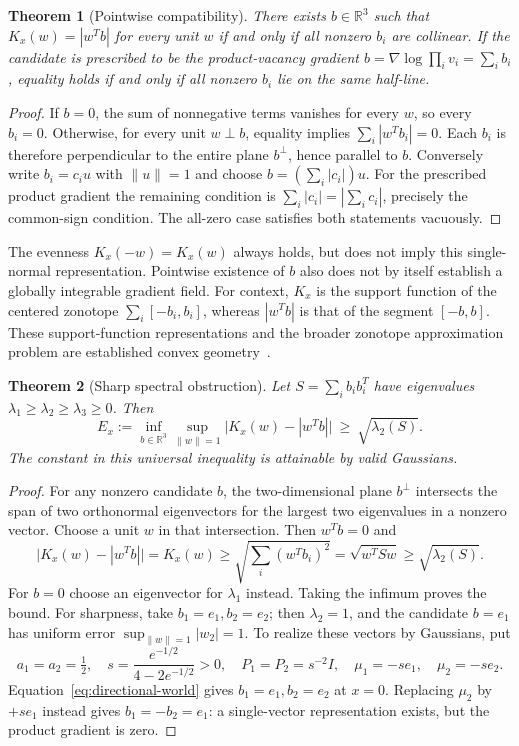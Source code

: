 \documentclass[11pt,a4paper]{article}
\newtheorem{theorem}{Theorem}
\newcommand{\R}{\mathbb{R}}
\begin{document}
\begin{theorem}[Pointwise compatibility]\label{thm:directional-rank}
There exists $b\in\R^3$ such that $K_x(w)=|w^Tb|$ for every unit $w$
if and only if all nonzero $b_i$ are collinear. If the candidate is
prescribed to be the product-vacancy gradient
$b=\nabla\log\prod_i v_i=\sum_i b_i$, equality holds if and only if
all nonzero $b_i$ lie on the same half-line.
\end{theorem}
\begin{proof}
If $b=0$, the sum of nonnegative terms vanishes for every $w$, so
every $b_i=0$. Otherwise, for every unit $w\perp b$, equality implies
$\sum_i|w^Tb_i|=0$. Each $b_i$ is therefore perpendicular to the
entire plane $b^\perp$, hence parallel to $b$. Conversely write
$b_i=c_i u$ with $\|u\|=1$ and choose $b=(\sum_i|c_i|)u$.
For the prescribed product gradient the remaining condition is
$\sum_i|c_i|=|\sum_i c_i|$, precisely the common-sign condition.
The all-zero case satisfies both statements vacuously.
\end{proof}

The evenness $K_x(-w)=K_x(w)$ always holds, but does not imply this
single-normal representation. Pointwise existence of $b$ also does
not by itself establish a globally integrable gradient field.
For context, $K_x$ is the support function of the centered zonotope
$\sum_i[-b_i,b_i]$, whereas $|w^Tb|$ is that of the segment $[-b,b]$.
These support-function representations and the broader zonotope
approximation problem are established convex geometry~\cite{siegel,torres}.

\begin{theorem}[Sharp spectral obstruction]\label{thm:directional-bound}
Let $S=\sum_i b_i b_i^T$ have eigenvalues
$\lambda_1\ge\lambda_2\ge\lambda_3\ge0$. Then
\begin{equation}\label{eq:directional-error}
 E_x:=\inf_{b\in\R^3}\sup_{\|w\|=1}
       \bigl|K_x(w)-|w^Tb|\bigr|\ \ge\ \sqrt{\lambda_2(S)}.
\end{equation}
The constant in this universal inequality is attainable by valid Gaussians.
\end{theorem}
\begin{proof}
For any nonzero candidate $b$, the two-dimensional plane $b^\perp$
intersects the span of two orthonormal eigenvectors for the largest
two eigenvalues in a nonzero vector. Choose a unit $w$ in that
intersection. Then $w^Tb=0$ and
\[
 \bigl|K_x(w)-|w^Tb|\bigr|=K_x(w)
 \ge\sqrt{\sum_i(w^Tb_i)^2}
 =\sqrt{w^TSw}\ge\sqrt{\lambda_2(S)}.
\]
For $b=0$ choose an eigenvector for $\lambda_1$ instead. Taking the
infimum proves the bound. For sharpness, take $b_1=e_1,b_2=e_2$;
then $\lambda_2=1$, and the candidate $b=e_1$ has uniform error
$\sup_{\|w\|=1}|w_2|=1$. To realize these vectors by Gaussians, put
\[
 a_1=a_2=\tfrac12,\quad
 s=\frac{e^{-1/2}}{4-2e^{-1/2}}>0,\quad
 P_1=P_2=s^{-2}I,\quad \mu_1=-s e_1,\quad \mu_2=-s e_2.
\]
Equation~\eqref{eq:directional-world} gives $b_1=e_1,b_2=e_2$ at
$x=0$. Replacing $\mu_2$ by $+s e_1$ instead gives $b_1=-b_2=e_1$:
a single-vector representation exists, but the product gradient is zero.
\end{proof}
\end{document}
